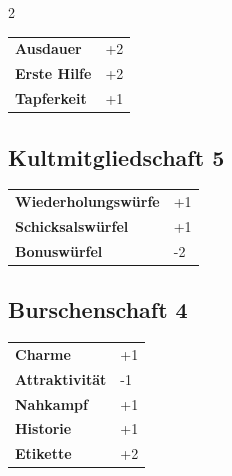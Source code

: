 \begin{multicols}{2}
\begin{tcolorbox}
\begin{tabular}{@{}ll@{}}
    \textbf{Ausdauer} & +2\\
    \textbf{Erste Hilfe} & +2\\
    \textbf{Tapferkeit} & +1\\
\end{tabular}


\end{tcolorbox}

\begin{tcolorbox}
    \subsection*{Kultmitgliedschaft \hfill \small{5 }}
    \tcblower




\begin{tabular}{@{}ll@{}}
    \textbf{Wiederholungswürfe} & +1\\
    \textbf{Schicksalswürfel} & +1\\
    \textbf{Bonuswürfel} & -2\\
\end{tabular}


\end{tcolorbox}

\begin{tcolorbox}
    \subsection*{Burschenschaft \hfill \small{4 }}
    \tcblower




\begin{tabular}{@{}ll@{}}
    \textbf{Charme} & +1\\
    \textbf{Attraktivität} & -1\\
    \textbf{Nahkampf} & +1\\
    \textbf{Historie} & +1\\
    \textbf{Etikette} & +2\\
\end{tabular}


\end{tcolorbox}
\end{multicols}
